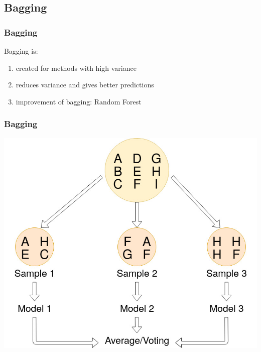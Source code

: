 \subsection{Bagging}

\begin{frame}
    \frametitle{Bagging}

	Bagging is:
    \begin{enumerate}
    \item created for methods with high variance
    \item reduces variance and gives better predictions
    \item improvement of bagging: Random Forest
    \end{enumerate}
    

\end{frame}

\begin{frame}
    \frametitle{Bagging}

	\begin{center}		
		\includegraphics[height=0.7\textheight]{images/bagging_1.jpg}
	\end{center}

\end{frame}